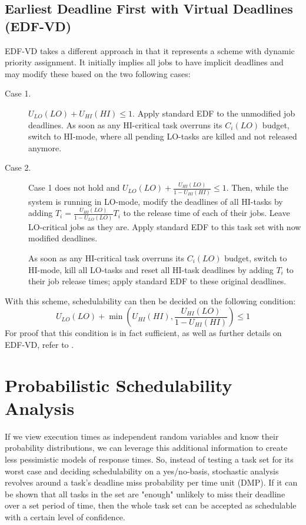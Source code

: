 \documentclass[a4paper,oneside]{csthesis}
\begin{document}
\subsection{Earliest Deadline First with Virtual Deadlines (EDF-VD)}
\label{subsec:edf-vd}
EDF-VD takes a different approach in that it represents a scheme with dynamic priority assignment. It initially implies all jobs to have implicit deadlines and may modify these based on the two following cases:
\begin{description}
    \item [Case 1.] $U_{LO}(LO) + U_{HI}(HI) \leq 1$. Apply standard EDF to the unmodified job deadlines. As soon as any HI-critical task overruns its $C_i(LO)$ budget, switch to HI-mode, where all pending LO-tasks are killed and not released anymore.
    \item [Case 2.] Case 1 does not hold and $U_{LO}(LO) + \frac{U_{HI}(LO)}{1 - U_{HI}(HI)} \leq 1$. Then, while the system is running in LO-mode, modify the deadlines of all HI-tasks by adding $\widehat{T}_i = \frac{U_{HI}(LO)}{1 - U_{LO}(LO)} T_i$ to the release time of each of their jobs. Leave LO-critical jobs as they are. Apply standard EDF to this task set with now modified deadlines. 
    
    As soon as any HI-critical task overruns its $C_i(LO)$ budget, switch to HI-mode, kill all LO-tasks and reset all HI-task deadlines by adding $T_i$ to their job release times; apply standard EDF to these original deadlines.
 \end{description}
 With this scheme, schedulability can then be decided on the following condition:
 \begin{equation*}
     U_{LO}(LO) + \min{\left(U_{HI}(HI), \frac{U_{HI}(LO)}{1 - U_{HI}(HI)}\right)} \leq 1
 \end{equation*}
 For proof that this condition is in fact sufficient, as well as further details on EDF-VD, refer to \cite{baruah2011mixed}.

\section{Probabilistic Schedulability Analysis}
\label{sec:sys-model-prob-ana}
If we view execution times as independent random variables and know their probability distributions, we can leverage this additional information to create less pessimistic models of response times. So, instead of testing a task set for its worst case and deciding schedulability on a yes/no-basis, stochastic analysis revolves around a task's deadline miss probability per time unit (DMP). If it can be shown that all tasks in the set are "enough" unlikely to miss their deadline over a set period of time, then the whole task set can be accepted as schedulable with a certain level of confidence.
\end{document}
